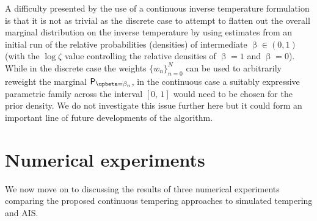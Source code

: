 A difficulty presented by the use of a continuous inverse temperature formulation is that it is not as trivial as the discrete case to attempt to flatten out the overall marginal distribution on the inverse temperature by using estimates from an initial run of the relative probabilities (densities) of intermediate $\upbeta \in (0, 1)$ (with the $\log \zeta$ value controlling the relative densities of $\upbeta = 1$ and $\upbeta = 0$). While in the discrete case the weights $\lbrace w_n \rbrace_{n=0}^N$ can be used to arbitrarily reweight the marginal $\prob{\upbeta = \beta_n}$, in the continuous case a suitably expressive parametric family across the interval $[0,\,1]$ would need to be chosen for the prior density. We do not investigate this issue further here but it could form an important line of future developments of the algorithm.%

\section{Numerical experiments}\label{sec:ct-experiments}

We now move on to discussing the results of three numerical experiments comparing the proposed continuous tempering approaches to simulated tempering and \ac{AIS}.

